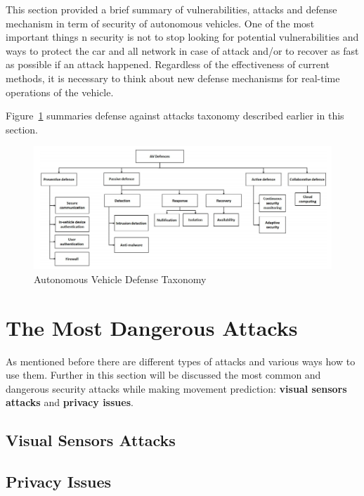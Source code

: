 This section provided a brief summary of vulnerabilities, attacks and defense mechanism in term of security of autonomous vehicles. One of the most important things n security is not to stop looking for potential vulnerabilities and ways to protect the car and all network in case of attack and/or to recover as fast as possible if an attack happened. Regardless of the effectiveness of current methods, it is necessary to think about new defense mechanisms for real-time operations of the vehicle. 	

Figure~\ref{fig:DefenseTaxonomy} summaries defense against attacks taxonomy described earlier in this section.

\begin{figure}[h]
	\centering  	
	\includegraphics[width=15cm]{img/7.jpg}
	\caption{Autonomous Vehicle Defense Taxonomy \cite{sec}}
	\label{fig:DefenseTaxonomy}    
\end{figure}

\section{The Most Dangerous Attacks}

As mentioned before there are different types of attacks and various ways how to use them. Further in this section will be discussed the most common and dangerous security attacks while making movement prediction: \textbf{visual sensors attacks} and \textbf{privacy issues}.

\subsection{Visual Sensors Attacks}

\subsection{Privacy Issues}

